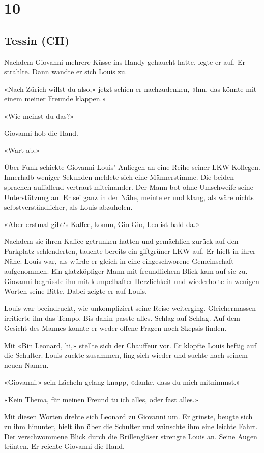 \chapter{10}

\section{Tessin (CH)}

Nachdem Giovanni mehrere Küsse ins Handy gehaucht hatte, legte er auf. Er strahlte. Dann wandte er sich Louis zu.

«Nach Zürich willst du also,» jetzt schien er nachzudenken, «hm, das könnte mit einem meiner Freunde klappen.»

«Wie meinst du das?»

Giovanni hob die Hand.

«Wart ab.»

Über Funk schickte Giovanni Louis’ Anliegen an eine Reihe seiner LKW-Kollegen. Innerhalb weniger Sekunden  
meldete sich eine Männerstimme. Die beiden sprachen auffallend vertraut
miteinander. Der Mann bot ohne Umschweife seine Unterstützung an. Er sei ganz in der Nähe, meinte er und klang, als wäre
nichts selbstverständlicher, als Louis abzuholen. 

«Aber erstmal gibt`s Kaffee, komm, Gio-Gio, Leo ist bald da.»

Nachdem sie ihren Kaffee getrunken hatten und gemächlich zurück auf den Parkplatz schlenderten, tauchte bereits ein 
giftgrüner LKW auf. Er hielt in ihrer Nähe. Louis war, als würde er
gleich in eine eingeschworene Gemeinschaft aufgenommen.
Ein glatzköpfiger Mann mit freundlichem Blick kam auf sie zu. Giovanni
begrüsste ihn mit kumpelhafter Herzlichkeit und wiederholte in wenigen
Worten seine Bitte. Dabei zeigte er auf Louis.

Louis war beeindruckt, wie unkompliziert seine Reise weiterging.
Gleichermassen irritierte ihn das Tempo. Bis dahin passte alles. Schlag
auf Schlag. Auf dem Gesicht des Mannes konnte er weder offene Fragen noch Skepsis finden.

Mit «Bin Leonard, hi,» stellte sich der Chauffeur vor. Er klopfte Louis
heftig auf die Schulter. Louis zuckte zusammen, fing sich wieder und
suchte nach seinem neuen Namen.

«Giovanni,» sein Lächeln gelang knapp, «danke, dass du mich
mitnimmst.»

«Kein Thema, für meinen Freund tu ich alles, oder fast alles.»

Mit diesen Worten drehte sich Leonard zu Giovanni um. Er grinste, beugte
sich zu ihm hinunter, hielt ihn über die Schulter und wünschte ihm
eine leichte Fahrt.
Der verschwommene Blick durch die Brillengläser strengte Louis an. Seine Augen
tränten.
Er reichte Giovanni die Hand. 

